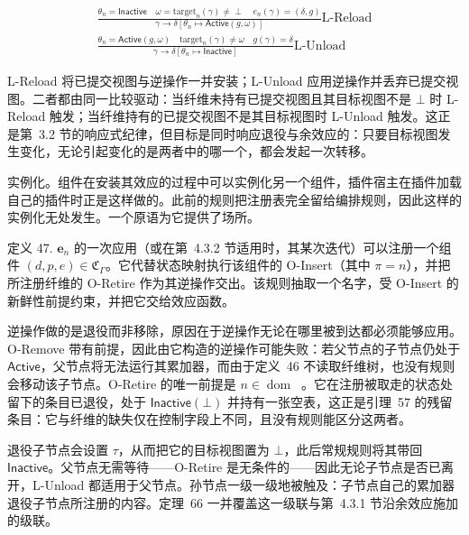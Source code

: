 \documentclass[
  10
]{article}
\begin{document}
\[
\begin{array} { r }
{ \frac { \theta _ { n } = \mathsf { I n a c t i v e } \quad \omega = \mathrm { t a r g e t } _ { n } ( \gamma ) \neq \perp \quad e _ { n } ( \gamma ) = ( \delta , g ) } { \gamma \longrightarrow \delta [ \theta _ { n } \mapsto \mathsf { A c t i v e } ( g , \omega ) ] } \mathrm { L } \text {-Reload} } \\
{ \frac { \theta _ { n } = \mathsf { A c t i v e } ( g , \omega ) \quad \mathrm { t a r g e t } _ { n } ( \gamma ) \neq \omega \quad g ( \gamma ) = \delta } { \gamma \longrightarrow \delta [ \theta _ { n } \mapsto \mathsf { I n a c t i v e } ] } \mathrm { L } \text {-Unload} }
\end{array}
\]

L-Reload 将已提交视图与逆操作一并安装；L-Unload 应用逆操作并丢弃已提交视图。二者都由同一比较驱动：当纤维未持有已提交视图且其目标视图不是 $\bot$ 时 L-Reload 触发；当纤维持有的已提交视图不是其目标视图时 L-Unload 触发。这正是第~3.2 节的响应式纪律，但目标是同时响应退役与余效应的：只要目标视图发生变化，无论引起变化的是两者中的哪一个，都会发起一次转移。

实例化。组件在安装其效应的过程中可以实例化另一个组件，插件宿主在插件加载自己的插件时正是这样做的。此前的规则把注册表完全留给编排规则，因此这样的实例化无处发生。一个原语为它提供了场所。

定义 47. \(\boldsymbol { e } _ { n }\) 的一次应用（或在第~4.3.2 节适用时，其某次迭代）可以注册一个组件 \(( d , p , e ) \in \mathfrak { C } _ { \Gamma }\)。它代替状态映射执行该组件的 O-Insert（其中 \(\pi = n\)），并把所注册纤维的 O-Retire 作为其逆操作交出。该规则抽取一个名字，受 O-Insert 的新鲜性前提约束，并把它交给效应函数。

逆操作做的是退役而非移除，原因在于逆操作无论在哪里被到达都必须能够应用。O-Remove 带有前提，因此由它构造的逆操作可能失败：若父节点的子节点仍处于 $\mathsf { A c t i v e }$，父节点将无法运行其累加器，而由于定义~46 不读取纤维树，也没有规则会移动该子节点。O-Retire 的唯一前提是 \(n \in \mathop { \mathrm { d o m } } \mathop { \left( F _ { \gamma } \right) }\)。它在注册被取走的状态处留下的条目已退役，处于 \(\mathsf { I n a c t i v e } ( \bot )\) 并持有一张空表，这正是引理~57 的残留条目：它与纤维的缺失仅在控制字段上不同，且没有规则能区分这两者。

退役子节点会设置 \(\tau\)，从而把它的目标视图置为 $\bot$，此后常规规则将其带回 $\mathsf { I n a c t i v e }$。父节点无需等待——O-Retire 是无条件的——因此无论子节点是否已离开，L-Unload 都适用于父节点。孙节点一级一级地被触及：子节点自己的累加器退役子节点所注册的内容。定理~66 一并覆盖这一级联与第~4.3.1 节沿余效应施加的级联。
\end{document}
